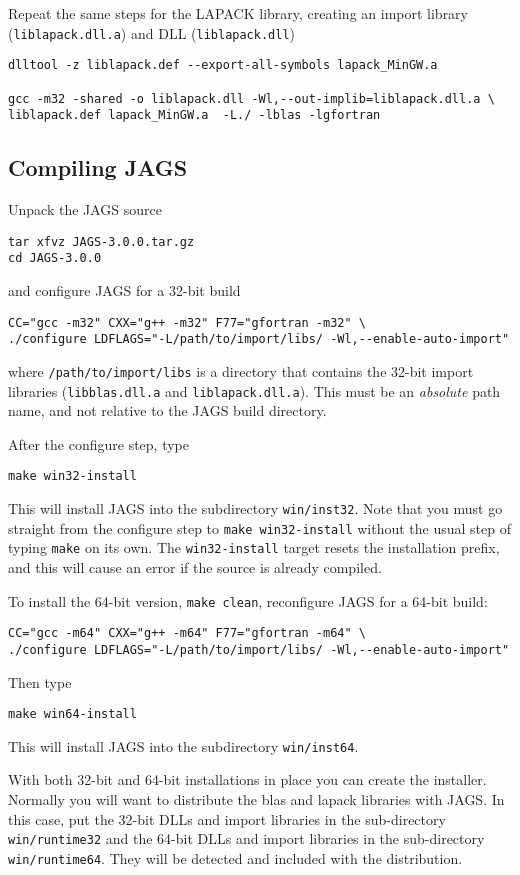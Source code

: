 \documentclass[11pt, a4paper, titlepage]{article}
\newcommand{\JAGS}{\textsf{JAGS}}
\begin{document}
Repeat the same steps for the LAPACK library, creating an import library
(\verb+liblapack.dll.a+) and DLL (\verb+liblapack.dll+)
\begin{verbatim}
dlltool -z liblapack.def --export-all-symbols lapack_MinGW.a

gcc -m32 -shared -o liblapack.dll -Wl,--out-implib=liblapack.dll.a \
liblapack.def lapack_MinGW.a  -L./ -lblas -lgfortran
\end{verbatim}

\subsection{Compiling \JAGS}

Unpack the JAGS source
\begin{verbatim}
tar xfvz JAGS-3.0.0.tar.gz
cd JAGS-3.0.0
\end{verbatim}
and configure JAGS for a 32-bit build
\begin{verbatim}
CC="gcc -m32" CXX="g++ -m32" F77="gfortran -m32" \
./configure LDFLAGS="-L/path/to/import/libs/ -Wl,--enable-auto-import" 
\end{verbatim}
where \verb+/path/to/import/libs+ is a directory that contains the
32-bit import libraries (\verb+libblas.dll.a+ and
\verb+liblapack.dll.a+).  This must be an {\em absolute} path name,
and not relative to the JAGS build directory.

After the configure step, type
\begin{verbatim}
make win32-install
\end{verbatim}
This will install JAGS into the subdirectory \verb+win/inst32+.
Note that you must go straight from the configure step to \texttt{make
  win32-install} without the usual step of typing \texttt{make} on
its own.  The \texttt{win32-install} target resets the installation
prefix, and this will cause an error if the source is already
compiled.

To install the 64-bit version, \verb+make clean+, reconfigure JAGS
for a 64-bit build:
\begin{verbatim}
CC="gcc -m64" CXX="g++ -m64" F77="gfortran -m64" \
./configure LDFLAGS="-L/path/to/import/libs/ -Wl,--enable-auto-import" 
\end{verbatim}
Then type
\begin{verbatim}
make win64-install
\end{verbatim}
This will install JAGS into the subdirectory \verb+win/inst64+.

With both 32-bit and 64-bit installations in place you can create the
installer.  Normally you will want to distribute the blas and lapack
libraries with JAGS.  In this case, put the 32-bit DLLs and import
libraries in the sub-directory \verb+win/runtime32+ and the 64-bit
DLLs and import libraries in the sub-directory
\verb+win/runtime64+. They will be detected and included with the
distribution.
\end{document}
